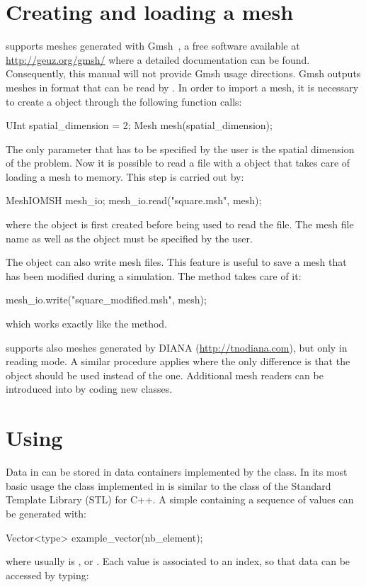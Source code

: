\section{Creating and loading a mesh\label{sect:common:mesh}}

\akantu supports meshes generated with Gmsh~\cite{gmsh}, a free
software available at \url{http://geuz.org/gmsh/} where a detailed
documentation can be found. Consequently, this manual will not provide
Gmsh usage directions. Gmsh outputs meshes in  format that can be read
by \akantu. In order to import a mesh, it is necessary to create
a  object through the following function calls:
\begin{cpp}
  UInt spatial_dimension = 2;
  Mesh mesh(spatial_dimension);
\end{cpp}
The only parameter that has to be specified by the user is the spatial
dimension of the problem. Now it is possible to read a  file with
a  object that takes care of loading a mesh to memory.
This step is carried out by:
\begin{cpp}
  MeshIOMSH mesh_io;
  mesh_io.read("square.msh", mesh);
\end{cpp}
where the  object is first created before being
used to read the  file. The mesh file name as well as the 
object must be specified by the user.

The  object can also write mesh files. This feature
is useful to save a mesh that has been modified during a
simulation. The  method takes care of it:
\begin{cpp}
  mesh_io.write("square_modified.msh", mesh);
\end{cpp}
which works exactly like the  method.

\akantu supports also meshes generated by
DIANA (\url{http://tnodiana.com}), but only in reading mode. A similar
procedure applies where the only
difference is that the  object should be used
instead of the  one. Additional mesh readers can be
introduced into \akantu by coding new  classes.

\section{Using }

Data in \akantu can be stored in data containers implemented by
the  class. In its most basic usage the  class
implemented in \akantu is similar to the  class of
the Standard Template Library (STL) for C++. A simple 
containing a sequence of  values can be generated with:
\begin{cpp}
  Vector<type> example_vector(nb_element);
\end{cpp}
where  usually is ,  or
. Each value is associated to an index, so that data can be
accessed by typing:

